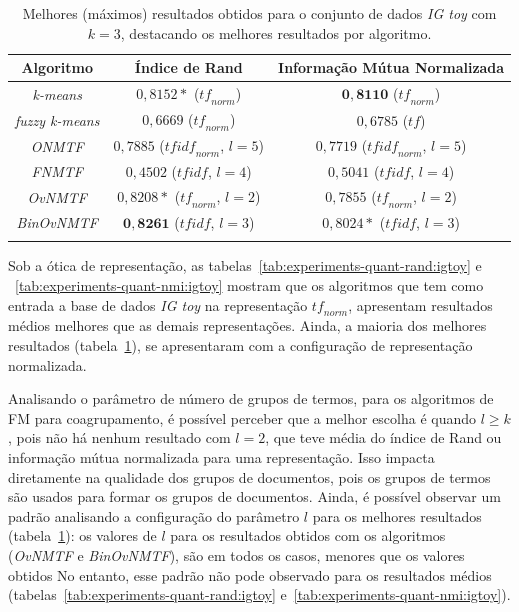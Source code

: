\documentclass[
    12pt,                %
    oneside,            %
    a4paper,            %
    english,            %
    brazil                %
    ]{abntex2ppgsi}
\begin{document}
\begin{table}[H]
\centering
    \caption{Melhores (máximos) resultados obtidos para o conjunto de dados \textit{IG toy} com $k = 3$, destacando os melhores resultados por algoritmo.}
    \begin{tabular}{ccc}
        \hline
        Algoritmo              & Índice de Rand & Informação Mútua Normalizada \\
        \hline
        \textit{k-means}       & $0,8152*$ ($\textit{tf}_{norm}$)            & $\mathbf{0,8110}$ ($\textit{tf}_{norm}$) \\
        \textit{fuzzy k-means} & $0,6669$ ($\textit{tf}_{norm}$)             & $0,6785$ ($\textit{tf}$) \\
        \textit{ONMTF}         & $0,7885$ ($\textit{tfidf}_{norm}$, $l=5$)   & $0,7719$ ($\textit{tfidf}_{norm}$, $l=5$) \\
        \textit{FNMTF}         & $0,4502$ ($\textit{tfidf}$, $l=4$)          & $0,5041$ ($\textit{tfidf}$, $l=4$) \\
        \textit{OvNMTF}        & $0,8208*$ ($\textit{tf}_{norm}$, $l=2$)     & $0,7855$ ($\textit{tf}_{norm}$, $l=2$) \\
        \textit{BinOvNMTF}     & $\mathbf{0,8261}$ ($\textit{tfidf}$, $l=3$) & $0,8024*$ ($\textit{tfidf}$, $l=3$) \\
        \hline \\
    \end{tabular}
    \label{tab:experiments-quant-best:igtoy}
\end{table}

Sob a ótica de representação, as tabelas~\ref{tab:experiments-quant-rand:igtoy} e ~\ref{tab:experiments-quant-nmi:igtoy} mostram que os algoritmos que tem como entrada a base de dados \textit{IG toy} na representação $\textit{tf}_{norm}$, apresentam resultados médios melhores que as demais representações.
Ainda, a maioria dos melhores resultados (tabela~\ref{tab:experiments-quant-best:igtoy}), se apresentaram com a configuração de representação normalizada.

Analisando o parâmetro de número de grupos de termos, para os algoritmos de FM para coagrupamento, é possível perceber que a melhor escolha é quando $l \geq k$, pois não há nenhum resultado com $l = 2$, que teve média do índice de Rand ou informação mútua normalizada para uma representação.
Isso impacta diretamente na qualidade dos grupos de documentos, pois os grupos de termos são usados para formar os grupos de documentos.
Ainda, é possível observar um padrão analisando a configuração do parâmetro $l$ para os melhores resultados (tabela~\ref{tab:experiments-quant-best:igtoy}): os valores de $l$ para os resultados obtidos com os algoritmos (\textit{OvNMTF} e \textit{BinOvNMTF}), são em todos os casos, menores que os valores obtidos
No entanto, esse padrão não pode observado para os resultados médios (tabelas~\ref{tab:experiments-quant-rand:igtoy} e~\ref{tab:experiments-quant-nmi:igtoy}).
\end{document}
